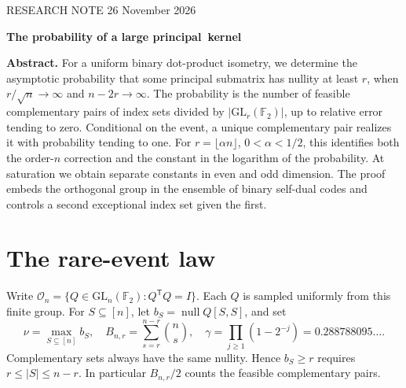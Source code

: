 \documentclass[11pt,letterpaper]{article}
\newcommand{\F}{\mathbb F_2}\newcommand{\E}{\mathbb E}\newcommand{\PP}{\mathbb P}
\newcommand{\GL}{\mathrm{GL}}\newcommand{\nul}{\operatorname{null}}
\newcommand{\rgp}{\mathcal O}
\begin{document}
\thispagestyle{plain}
{\small\sffamily\color{ink} RESEARCH NOTE \hfill 26 November 2026}\par\vspace{.6em}
{\noindent\fontsize{21}{25}\selectfont\bfseries The probability of a large \mbox{principal kernel}\par}
\vspace{.35em}{\large Rare events for uniform binary orthogonal matrices}\par\vspace{.7em}
\noindent\textbf{Abstract.}
For a uniform binary dot-product isometry, we determine the asymptotic probability that some principal submatrix has nullity at least $r$, when $r/\sqrt n\to\infty$ and $n-2r\to\infty$. The probability is the number of feasible complementary pairs of index sets divided by $|\GL_r(\F)|$, up to relative error tending to zero. Conditional on the event, a unique complementary pair realizes it with probability tending to one. For $r=\lfloor\alpha n\rfloor$, $0<\alpha<1/2$, this identifies both the order-$n$ correction and the constant in the logarithm of the probability. At saturation we obtain separate constants in even and odd dimension. The proof embeds the orthogonal group in the ensemble of binary self-dual codes and controls a second exceptional index set given the first.

\section{The rare-event law}
Write $\rgp_n=\{Q\in\GL_n(\F): Q^{\mathsf T}Q=I\}$. Each $Q$ is sampled uniformly from this finite group. For $S\subseteq[n]$, let $b_S=\nul Q[S,S]$, and set
\[
 \nu=\max_{S\subseteq[n]}b_S,\quad
 B_{n,r}=\sum_{s=r}^{n-r}\binom ns,\quad
 \gamma=\prod_{j\ge1}(1-2^{-j})=0.288788095\ldots .
\]
Complementary sets always have the same nullity. Hence $b_S\ge r$ requires $r\le |S|\le n-r$. In particular $B_{n,r}/2$ counts the feasible complementary pairs.
\end{document}
